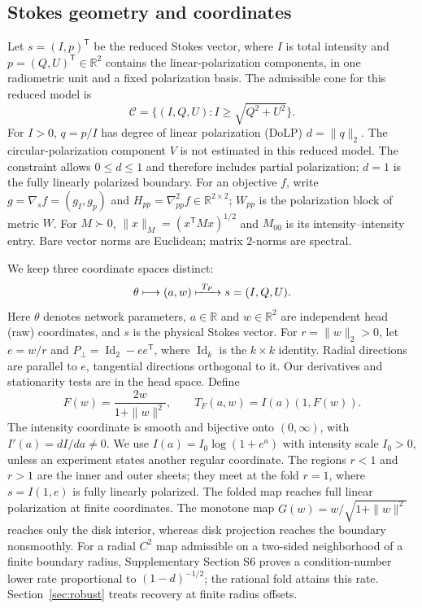 \documentclass[10pt,a4paper]{article}
\begin{document}
\subsection{Stokes geometry and coordinates}
\label{sec:model}
Let $s=(I,p)^{\mathsf T}$ be the reduced Stokes vector, where $I$ is total intensity and $p=(Q,U)^{\mathsf T}\in\mathbb R^2$ contains the linear-polarization components, in one radiometric unit and a fixed polarization basis. The admissible cone for this reduced model is
\begin{equation}
 \mathcal C=\{(I,Q,U):I\geq\sqrt{Q^2+U^2}\}.
 \label{eq:cone}
\end{equation}
For $I>0$, $q=p/I$ has degree of linear polarization (DoLP) $d=\|q\|_2$. The circular-polarization component $V$ is not estimated in this reduced model. The constraint allows $0\leq d\leq1$ and therefore includes partial polarization; $d=1$ is the fully linearly polarized boundary. For an objective $f$, write $g=\nabla_s f=(g_I,g_p)$ and $H_{pp}=\nabla^2_{pp}f\in\mathbb R^{2\times2}$; $W_{pp}$ is the polarization block of metric $W$. For $M\succ0$, $\|x\|_M=(x^{\mathsf T}Mx)^{1/2}$ and $M_{00}$ is its intensity--intensity entry. Bare vector norms are Euclidean; matrix $2$-norms are spectral.

We keep three coordinate spaces distinct:
\begin{equation}
 \theta\longmapsto(a,w)\xmapsto{\ T_F\ }s=(I,Q,U).
 \label{eq:spaces}
\end{equation}
Here $\theta$ denotes network parameters, $a\in\mathbb R$ and $w\in\mathbb R^2$ are independent head (raw) coordinates, and $s$ is the physical Stokes vector. For $r=\|w\|_2>0$, let $e=w/r$ and $P_\perp=\operatorname{Id}_2-ee^{\mathsf T}$, where $\operatorname{Id}_k$ is the $k\times k$ identity. Radial directions are parallel to $e$, tangential directions orthogonal to it. Our derivatives and stationarity tests are in the head space. Define
\begin{equation}
 F(w)=\frac{2w}{1+\|w\|^2},\qquad
 T_F(a,w)=I(a)(1,F(w)).
 \label{eq:foldmap}
\end{equation}
The intensity coordinate is smooth and bijective onto $(0,\infty)$, with $I'(a)=dI/da\ne0$. We use $I(a)=I_0\log(1+e^a)$ with intensity scale $I_0>0$, unless an experiment states another regular coordinate. The regions $r<1$ and $r>1$ are the inner and outer sheets; they meet at the fold $r=1$, where $s=I(1,e)$ is fully linearly polarized. The folded map reaches full linear polarization at finite coordinates. The monotone map $G(w)=w/\sqrt{1+\|w\|^2}$ reaches only the disk interior, whereas disk projection reaches the boundary nonsmoothly. For a radial $C^2$ map admissible on a two-sided neighborhood of a finite boundary radius, Supplementary Section S6 proves a condition-number lower rate proportional to $(1-d)^{-1/2}$; the rational fold attains this rate. Section~\ref{sec:robust} treats recovery at finite radius offsets.
\end{document}
